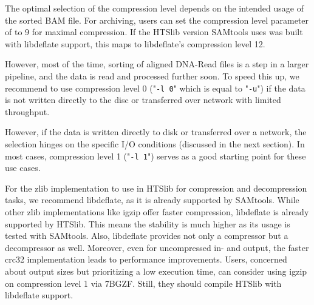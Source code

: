 The optimal selection of the compression level depends on the intended usage of the sorted BAM file.
For archiving, users can set the compression level parameter of \sort to 9 for maximal compression. If the HTSlib version SAMtools uses was built with libdeflate support, this maps to libdeflate's compression level 12. 

However, most of the time, sorting of aligned DNA-Read files is a step in a larger pipeline, and the data is read and processed further soon.
To speed this up, we recommend to use compression level 0 ("\texttt{-l 0}" which is equal to "\texttt{-u}") if the data is not written directly to the disc or transferred over network with limited throughput. 

However, if the data is written directly to disk or transferred over a network, the selection hinges on the specific I/O conditions (discussed in the next section). In most cases, compression level 1 ("\texttt{-l 1}") serves as a good starting point for these use cases.

For the zlib implementation to use in HTSlib for compression and decompression tasks, we recommend libdeflate, as it is already supported by SAMtools. While other zlib implementations like igzip offer faster compression, libdeflate is already supported by HTSlib. This means the stability is much higher as its usage is tested with SAMtools. Also, libdeflate provides not only a compressor but a decompressor as well. Moreover, even for uncompressed in- and output, the faster crc32 implementation leads to performance improvements. 
Users, concerned about output sizes but prioritizing a low execution time, can consider using igzip on compression level 1 via 7BGZF. Still, they should compile HTSlib with libdeflate support. 


